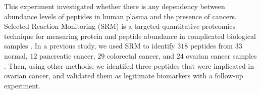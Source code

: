 \documentclass[11pt]{extarticle}
\begin{document}
This experiment investigated whether there is any dependency between abundance levels of peptides in human plasma and the presence of cancers.  Selected Reaction Monitoring (SRM) is a targeted quantitative proteomics technique for measuring protein and peptide abundance in complicated biological samples \cite{PMID21248225}. In a previous study, we used SRM to identify $318$ peptides from
$33$ normal, $12$ pancreatic cancer, $29$ colorectal cancer, and $24$ ovarian cancer samples \cite{Wang2017}. Then, using other methods, we identifed three peptides that were implicated in ovarian cancer, and validated them as legitimate biomarkers with a follow-up experiment.
%
\end{document}
